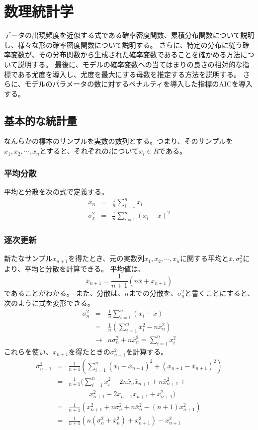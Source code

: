 \chapter{数理統計学}
データの出現頻度を近似する式である確率密度関数、累積分布関数について説明し、様々な形の確率密度関数について説明する。
さらに、特定の分布に従う確率変数が、その分布関数から生成された確率変数であることを確かめる方法について説明する。
最後に、モデルの確率変数への当てはまりの良さの相対的な指標である尤度を導入し、尤度を最大にする母数を推定する方法を説明する。
さらに、モデルのパラメータの数に対するペナルティを導入した指標のAICを導入する。

\section{基本的な統計量}
なんらかの標本のサンプルを実数の数列とする。つまり、そのサンプルを$x_1,x_2,\cdots,x_n$とすると、それぞれの$i$について$x_i\in R$である。


\subsection{平均分散}
平均と分散を次の式で定義する。
\begin{eqnarray*}
    \bar{x}_n &=& \frac{1}{n}\sum_{i=1}^n x_i \\
    \sigma_x^2 &=& \frac{1}{n} \sum_{i=1}^n (x_i-\bar{x})^2
\end{eqnarray*}


\subsection{逐次更新}
新たなサンプル$x_{n+1}$を得たとき、元の実数列$x_1,x_2,\cdots,x_n$に関する平均と$\bar{x},\sigma_x^2$により、平均と分散を計算できる。
平均値は、
\begin{equation*}
    \bar{x}_{n+1} = \frac{1}{n+1}(n\bar{x}+x_{n+1})
\end{equation*}
であることがわかる。
また、分散は、$n$までの分散を、$\sigma_n^2$と書くことにすると、次のように式を変形できる。
\begin{eqnarray*}
    \sigma_n^2&=&\frac{1}{n}\sum_{i=1}^n(x_i-\bar{x})\\
    &=& \frac{1}{n}(\sum_{i=1}^n x_i^2-n\bar{x}_n^2)\\
    &\rightarrow& n\sigma^2_n+n\bar{x}_n^2 = \sum_{i=1}^n x_i^2
\end{eqnarray*}
これらを使い、$x_{n+1}$を得たときの$\sigma_{n+1}^2$を計算する。
\begin{eqnarray*}
    \sigma_{n+1}^2 &=& \frac{1}{n+1}(\sum_{i=1}^n (x_i-\bar{x}_{n+1})^2+(x_{n+1}-\bar{x}_{n+1})^2 ) \\
    &=& \frac{1}{n+1}(\sum_{i=1}^nx_i^2-2n\bar{x}_n\bar{x}_{n+1}+n\bar{x}^2_{n+1}+\\
    & &\qquad\quad x_{n+1}^2-2x_{n+1}\bar{x}_{n+1}+\bar{x}_{n+1}^2)\\
    &=& \frac{1}{n+1}(x_{n+1}^2
    +n\sigma_n^2+n\bar{x}_n^2-(n+1)x_{n+1}^2)\\
    &=& \frac{1}{n+1}(n(\sigma_n^2+\bar{x}_n^2)+x_{n+1}^2)-x_{n+1}^2
\end{eqnarray*}

